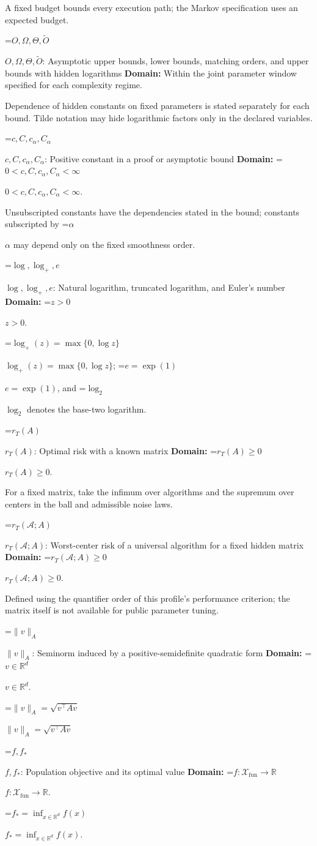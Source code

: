 \documentclass[10pt,a4paper]{article}
\newcommand{\AtlasMath}[1]{\par\begingroup\centering\setbox0=\hbox{$\displaystyle #1$}\ifdim\wd0>1.4\linewidth\typeout{ATLAS WIDE FORMULA: \the\wd0}\fi\ifdim\wd0>\linewidth\resizebox{\linewidth}{!}{\box0}\else\box0\fi\par\endgroup}
\newcommand{\AtlasInlineMath}[1]{\begingroup\setbox0=\hbox{$#1$}\ifdim\wd0>.4\linewidth\endgroup\AtlasMath{#1}\else\endgroup$#1$\fi}
\begin{document}
A fixed budget bounds every execution path; the Markov specification uses an expected budget.

\AtlasInlineMath{O,\Omega,\Theta,\widetilde{O}}: Asymptotic upper bounds, lower bounds, matching orders, and upper bounds with hidden logarithms \textbf{Domain:} Within the joint parameter window specified for each complexity regime.

Dependence of hidden constants on fixed parameters is stated separately for each bound. Tilde notation may hide logarithmic factors only in the declared variables.

\AtlasInlineMath{c,C,c_\alpha,C_\alpha}: Positive constant in a proof or asymptotic bound \textbf{Domain:} \AtlasInlineMath{0<c,C,c_\alpha,C_\alpha<\infty}.

Unsubscripted constants have the dependencies stated in the bound; constants subscripted by \AtlasInlineMath{\alpha} may depend only on the fixed smoothness order.

\AtlasInlineMath{\log,\log_+,e}: Natural logarithm, truncated logarithm, and Euler's number \textbf{Domain:} \AtlasInlineMath{z>0}.

\AtlasInlineMath{\log_+(z)=\max\{0,\log z\}}; \AtlasInlineMath{e=\exp(1)}, and \AtlasInlineMath{\log_2} denotes the base-two logarithm.

\AtlasInlineMath{r_T(A)}: Optimal risk with a known matrix \textbf{Domain:} \AtlasInlineMath{r_T(A)\ge0}.

For a fixed matrix, take the infimum over algorithms and the supremum over centers in the ball and admissible noise laws.

\AtlasInlineMath{r_T(\mathcal{A};A)}: Worst-center risk of a universal algorithm for a fixed hidden matrix \textbf{Domain:} \AtlasInlineMath{r_T(\mathcal{A};A)\ge0}.

Defined using the quantifier order of this profile's performance criterion; the matrix itself is not available for public parameter tuning.

\AtlasInlineMath{\|v\|_A}: Seminorm induced by a positive-semidefinite quadratic form \textbf{Domain:} \AtlasInlineMath{v\in\mathbb{R}^d}.

\AtlasInlineMath{\|v\|_A=\sqrt{v^\top Av}}

\AtlasInlineMath{f,f_*}: Population objective and its optimal value \textbf{Domain:} \AtlasInlineMath{f:\mathcal{X}_{\mathrm{fun}}\to\mathbb{R}}.

\AtlasInlineMath{f_*=\inf_{x\in \mathbb{R}^d}f(x)}.
\end{document}
